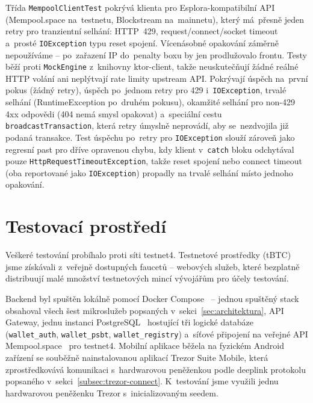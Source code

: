 Třída \texttt{Mempool\allowbreak Client\allowbreak Test} pokrývá
klienta pro Esplora-kompatibilní API (Mempool\allowbreak .space
na~testnetu, Blockstream na~mainnetu), který má~přesně jeden retry
pro tranzientní selhání: HTTP~429, request/connect/socket timeout
a~prosté \texttt{IO\allowbreak Exception} typu reset spojení. Vícenásobné opakování záměrně
nepoužíváme -- po~zařazení IP do~penalty boxu by jen prodlužovalo
frontu. Testy běží proti \texttt{MockEngine} z~knihovny ktor-client,
takže neuskutečňují žádné reálné HTTP volání ani neplýtvají rate
limity upstream API. Pokrývají úspěch na~první pokus (žádný retry),
úspěch po~jednom retry pro 429 i~\texttt{IOException}, trvalé selhání
(RuntimeException po~druhém pokusu), okamžité selhání pro non-429 4xx
odpovědi (404 nemá smysl opakovat) a~speciální cestu
\texttt{broadcast\allowbreak Transaction}, která retry úmyslně
neprovádí, aby se~nezdvojila již podaná transakce. Test úspěchu
po~retry pro \texttt{IOException} slouží zároveň jako regresní past
pro dříve opravenou chybu, kdy klient v~\texttt{catch} bloku odchytával
pouze \texttt{Http\allowbreak Request\allowbreak Timeout\allowbreak Exception},
takže reset spojení nebo connect timeout (oba reportované jako
\texttt{IOException}) propadly na trvalé selhání místo jednoho
opakování.

\section{Testovací prostředí}
\label{sec:test-prostredi}

Veškeré testování probíhalo proti síti testnet4. Testnetové prostředky
(tBTC) jsme získávali z~veřejně dostupných faucetů -- webových služeb, které
bezplatně distribuují malé množství testnetových mincí vývojářům pro účely
testování.

Backend byl spuštěn lokálně pomocí Docker Compose~\cite{Docker} -- jednou
spuštěný stack obsahoval všech šest mikroslužeb popsaných
v~sekci~\ref{sec:architektura}, API Gateway, jednu instanci
PostgreSQL~\cite{PostgreSQL} hostující tři logické databáze
(\texttt{wallet\_\allowbreak auth}, \texttt{wallet\_\allowbreak psbt},
\texttt{wallet\_\allowbreak registry}) a~síťové připojení na veřejné
API Mempool.space~\cite{MempoolAPI} pro testnet4. Mobilní aplikace
běžela na fyzickém Android zařízení se souběžně nainstalovanou aplikací
Trezor Suite Mobile, která zprostředkovává komunikaci s~hardwarovou peněženkou
podle deeplink protokolu popsaného v~sekci~\ref{subsec:trezor-connect}.
K~testování jsme využili jednu hardwarovou peněženku Trezor s~inicializovaným
seedem.

